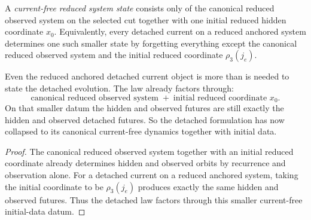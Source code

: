\begin{definition}
\label{def:current-free-reduced-system-state}
A \emph{current-free reduced system state} consists only of the canonical
reduced observed system on the selected cut together with one initial reduced
hidden coordinate \(x_0\). Equivalently, every detached current on a reduced
anchored system determines one such smaller state by forgetting everything
except the canonical reduced observed system and the initial reduced coordinate
\(\rho_3(j_e)\).
\end{definition}

\begin{corollary}
\label{thm:the-detached-law-already-factors-through-the-canonical-reduced-observed-system-plus-initial-coordinate}
Even the reduced anchored detached current object is more than is needed to
state the detached evolution. The law already factors through:
\[
\text{canonical reduced observed system}
\;+\;
\text{initial reduced coordinate }x_0.
\]
On that smaller datum the hidden and observed futures are still exactly the
hidden and observed detached futures. So the detached formulation has now collapsed to
its canonical current-free dynamics together with initial data.
\end{corollary}

\begin{proof}
The canonical reduced observed system together with an initial reduced
coordinate already determines hidden and observed orbits by recurrence and
observation alone. For a detached current on a reduced anchored system, taking the
initial coordinate to be \(\rho_3(j_e)\) produces exactly the same hidden and
observed futures. Thus the detached law factors through this smaller
current-free initial-data datum.
\end{proof}

